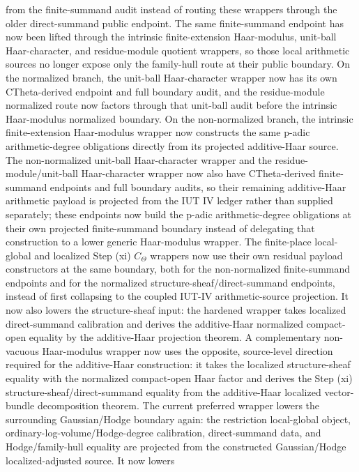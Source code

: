 \documentclass[11pt]{article}
\newcommand{\CTheta}{C_\Theta}
\theoremstyle{plain}
\theoremstyle{definition}
\theoremstyle{remark}
\begin{document}
  from the finite-summand audit instead of routing these wrappers through the
  older direct-summand public endpoint.
  The same finite-summand endpoint has now been lifted through the intrinsic
  finite-extension Haar-modulus, unit-ball Haar-character, and residue-module
  quotient wrappers, so those local arithmetic sources no longer expose only
  the family-hull route at their public boundary.  On the normalized branch,
  the unit-ball Haar-character wrapper now has its own CTheta-derived endpoint
  and full boundary audit, and the residue-module normalized route now factors
  through that unit-ball audit before the intrinsic Haar-modulus normalized
  boundary.  On the non-normalized branch, the intrinsic finite-extension
  Haar-modulus wrapper now constructs the same p-adic arithmetic-degree
  obligations directly from its projected additive-Haar source.  The
  non-normalized
  unit-ball Haar-character wrapper and the residue-module/unit-ball
  Haar-character wrapper now also have CTheta-derived finite-summand endpoints
  and full boundary audits, so their remaining additive-Haar arithmetic
  payload is projected from the IUT IV ledger rather than supplied separately;
  these endpoints now build the p-adic arithmetic-degree obligations at their
  own projected finite-summand boundary instead of delegating that construction
  to a lower generic Haar-modulus wrapper.  The finite-place local-global and
  localized Step (xi) \(\CTheta\) wrappers now use their own residual payload
  constructors at the same boundary, both for the non-normalized finite-summand
  endpoints and for the normalized structure-sheaf/direct-summand endpoints,
  instead of first collapsing to the coupled IUT-IV arithmetic-source
  projection.
  It now also lowers the structure-sheaf input:
  the hardened wrapper takes localized direct-summand calibration and derives
  the additive-Haar normalized compact-open equality by the additive-Haar
  projection theorem.  A complementary non-vacuous Haar-modulus wrapper now
  uses the opposite, source-level direction required for the additive-Haar
  construction: it takes the localized structure-sheaf equality with the
  normalized compact-open Haar factor and derives the Step (xi)
  structure-sheaf/direct-summand equality from the additive-Haar localized
  vector-bundle decomposition theorem.  The current preferred wrapper lowers
  the surrounding Gaussian/Hodge boundary again:
the restriction local-global object, ordinary-log-volume/Hodge-degree
calibration, direct-summand data, and Hodge/family-hull equality are projected
from the constructed Gaussian/Hodge localized-adjusted source.  It now lowers
\end{document}
